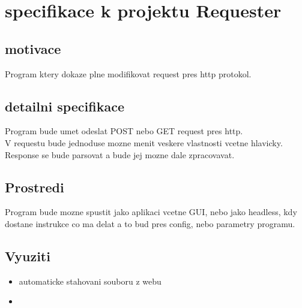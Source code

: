 \documentclass[a4paper]{article}
\begin{document}
\pagestyle{fancy}

\section{specifikace k projektu Requester}
\subsection{motivace}
Program ktery dokaze plne modifikovat request pres http protokol.

\subsection{detailni specifikace}
Program bude umet odeslat POST nebo GET request pres http.\\
V requestu bude jednoduse mozne menit veskere vlastnosti vcetne hlavicky.\\
Response se bude parsovat a bude jej mozne dale zpracovavat.\\

\subsection{Prostredi}
Program bude mozne spustit jako aplikaci vcetne GUI, nebo
jako headless, kdy dostane instrukce co ma delat a to bud pres
config, nebo parametry programu.

\subsection{Vyuziti}
\begin{itemize}
    \item automaticke stahovani souboru z webu
    \item 
\end{itemize}
\end{document}
